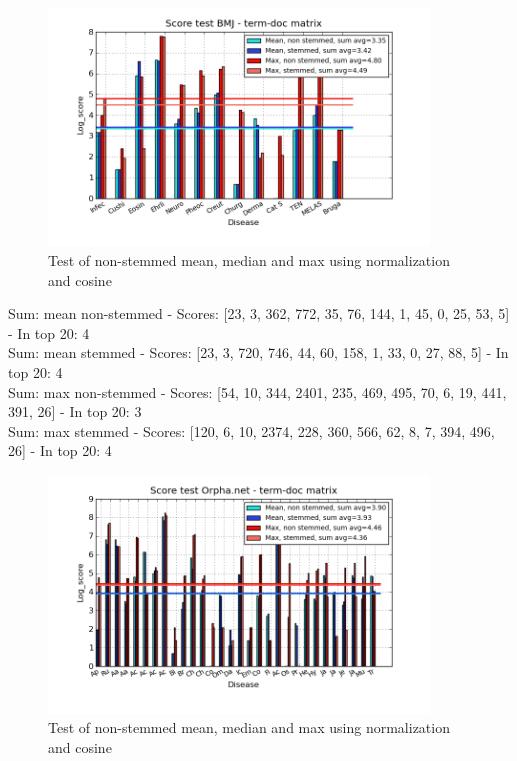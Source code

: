 \begin{figure}[h!]
        \begin{center}
          \includegraphics[width=0.9\textwidth]{barcharts/termDoc_bmj_hist_3000_ns_s_mea_max_sum.png}
        \end{center}
        \caption{Test of non-stemmed mean, median and max using normalization and cosine}
        \label{termDoc_bmj_hist_3000_ns_s_mea_max_sum}
\end{figure} 
{\small
Sum: mean non-stemmed - Scores: [23, 3, 362, 772, 35, 76, 144, 1, 45, 0, 25, 53, 5] - In top 20: 4 \\
Sum: mean stemmed - Scores: [23, 3, 720, 746, 44, 60, 158, 1, 33, 0, 27, 88, 5] - In top 20: 4 \\
Sum: max non-stemmed - Scores: [54, 10, 344, 2401, 235, 469, 495, 70, 6, 19, 441, 391, 26] - In top 20: 3 \\
Sum: max stemmed - Scores: [120, 6, 10, 2374, 228, 360, 566, 62, 8, 7, 394, 496, 26] - In top 20: 4
}
\begin{figure}[h!]
        \begin{center}
          \includegraphics[width=0.9\textwidth]{barcharts/termDoc_orphan_hist_3000_ns_s_mea_max_sum.png}
        \end{center}
        \caption{Test of non-stemmed mean, median and max using normalization and cosine}
        \label{termDoc_orphan_hist_3000_ns_s_mea_max_sum}
\end{figure} 
